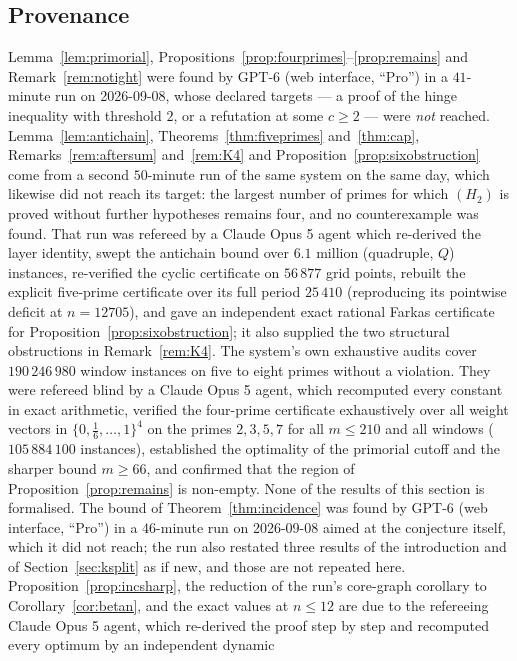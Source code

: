 \subsection*{Provenance}
Lemma~\ref{lem:primorial}, Propositions~\ref{prop:fourprimes}--\ref{prop:remains} and Remark~\ref{rem:notight} were
found by GPT-6 (web interface, ``Pro'') in a $41$-minute run on 2026-09-08, whose declared targets --- a proof of the
hinge inequality with threshold $2$, or a refutation at some $c\ge2$ --- were \emph{not} reached.
Lemma~\ref{lem:antichain}, Theorems~\ref{thm:fiveprimes} and~\ref{thm:cap}, Remarks~\ref{rem:aftersum} and~\ref{rem:K4}
and Proposition~\ref{prop:sixobstruction} come from a second $50$-minute run of the same system on the same day, which
likewise did not reach its target: the largest number of primes for which $(H_2)$ is proved without further hypotheses
remains four, and no counterexample was found. That run was refereed by a Claude Opus 5 agent which re-derived the layer
identity, swept the antichain bound over $6.1$ million (quadruple, $Q$) instances, re-verified the cyclic certificate on
$56\,877$ grid points, rebuilt the explicit five-prime certificate over its full period $25\,410$ (reproducing its
pointwise deficit at $n=12705$), and gave an independent exact rational Farkas certificate for
Proposition~\ref{prop:sixobstruction}; it also supplied the two structural obstructions in Remark~\ref{rem:K4}. The
system's own exhaustive audits cover $190\,246\,980$ window instances on five to eight primes without a violation. They were refereed
blind by a Claude Opus 5 agent, which recomputed every constant in exact arithmetic, verified the four-prime
certificate exhaustively over all weight vectors in $\{0,\tfrac16,\dots,1\}^4$ on the primes $2,3,5,7$ for all
$m\le210$ and all windows ($105\,884\,100$ instances), established the optimality of the primorial cutoff and the
sharper bound $m\ge66$, and confirmed that the region of Proposition~\ref{prop:remains} is non-empty. None of the
results of this section is formalised.
The bound of Theorem~\ref{thm:incidence} was found by GPT-6 (web interface, ``Pro'') in a $46$-minute
run on 2026-09-08 aimed at the conjecture itself, which it did not reach; the run also restated three
results of the introduction and of Section~\ref{sec:ksplit} as if new, and those are not repeated here.
Proposition~\ref{prop:incsharp}, the reduction of the run's core-graph corollary to
Corollary~\ref{cor:betan}, and the exact values at $n\le12$ are due to the refereeing Claude Opus 5
agent, which re-derived the proof step by step and recomputed every optimum by an independent dynamic
